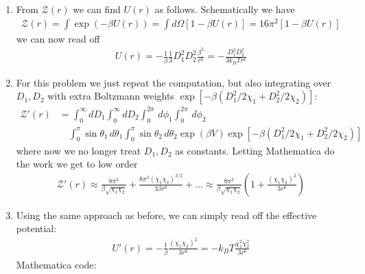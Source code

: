 \documentclass{article}
\theoremstyle{definition}
\newcommand{\be}{\beta}
\newcommand{\f}[2]{\frac{#1}{#2}}
\newcommand{\lp}{\left(}
\newcommand{\rp}{\right)}
\begin{document}
\begin{enumerate}[label=(\alph*)]
\begin{lstlisting}
	(*First order*)
	In[33]:= (*First order*)
	
	In[34]:= Integrate[Sin[\[Theta]1]*Sin[\[Theta]2]*\[Beta] (D1*D2)/(R^3)*(2*Cos[\[Theta]1]*
	Cos[\[Theta]2] - 
	Sin[\[Theta]1]*Sin[\[Theta]2]*
	Cos[\[Phi]1 - \[Phi]2] ), {\[Theta]1, 0, Pi}, {\[Theta]2, 0, 
	Pi}, {\[Phi]1, 0, 2 Pi}, {\[Phi]2, 0, 2 Pi}]
	
	Out[34]= 0
	
	(*Second order*)
	In[32]:= (*Second order*)
	
	In[25]:= Integrate[Sin[\[Theta]1]*Sin[\[Theta]2]*(\[Beta]^2/
	2)*(D1*D2)^2/(R^6)*(2*Cos[\[Theta]1]*Cos[\[Theta]2] - 
	Sin[\[Theta]1]*Sin[\[Theta]2]*
	Cos[\[Phi]1 - \[Phi]2] )^2, {\[Theta]1, 0, Pi}, {\[Theta]2, 0, 
	Pi}, {\[Phi]1, 0, 2 Pi}, {\[Phi]2, 0, 2 Pi}]
	
	Out[25]= (9 D1^2 D2^2 \[Pi]^4 \[Beta]^2)/(4 R^6)
	\end{lstlisting}
	
	\item From $\mathcal{Z}(r)$ we can find $U(r)$ as follows. Schematically we have
	\begin{align*}
	\mathcal{Z}(r) = \int \exp(-\be U(r)) = \int d\Omega [1-\be U(r)] = 16\pi^2 [1-\be U(r)]
	\end{align*}
	we can now read off 
	\begin{align*}
	U(r) = -\f{1}{\be} \f{1}{3} D_1^2 D_2^2 \f{\be^2}{r^6} = \boxed{ -\f{D_1^2 D_2^2 }{3k_BT r^6 }} 
	\end{align*}
	
	\item For this problem we just repeat the computation, but also integrating over $D_1, D_2$ with extra Boltzmann weights $\exp[-\be(D_1^2/2\chi_1 + D_2^2/2\chi_2)]$: 
	\begin{align*}
	\mathcal{Z}'(r) &= \int_0^\infty d D_1\int_0^\infty dD_2\int_0^{2\pi}\,d\phi_1 \int_0^{2\pi}\,d\phi_2 \\
	&\quad\int_0^\pi \sin\theta_1 \, d\theta_1 \int_0^\pi \sin\theta_2\, d\theta_2 \exp(\be V) \exp[-\be(D_1^2/2\chi_1 + D_2^2/2\chi_2)]
	\end{align*}
	where now we no longer treat $D_1,D_2$ as constants. Letting Mathematica do the work we get to low order
	\begin{align*}
	\mathcal{Z}'(r) \approx \f{8\pi^3}{\be \sqrt{\chi_1\chi_2}} + \f{8\pi^3 (\chi_1\chi_2)^{3/2}}{3\be r^6} + \dots \approx  \f{8\pi^3}{\be \sqrt{\chi_1 \chi_2}}\lp 1 + \f{(\chi_1\chi_2)^2}{3r^6} \rp
	\end{align*}
	
	
	
	\item Using the same approach as before, we can simply read off the effective potential:
	\begin{align*}
	U'(r) = -\f{1}{\be} \f{(\chi_1\chi_2)^2}{3r^6} = \boxed{-k_BT \f{\chi_1^2\chi_2^2}{3r^6}}
	\end{align*}
	Mathematica code:
\end{enumerate}
\end{document}
